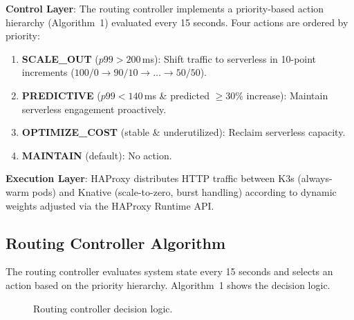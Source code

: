 \documentclass[conference,letterpaper]{IEEEtran}
\begin{document}
\textbf{Control Layer}: The routing controller implements a priority-based action hierarchy (Algorithm~1) evaluated every 15 seconds. Four actions are ordered by priority:
\begin{enumerate}
    \item \textbf{SCALE\_OUT} ($p99 > 200$\,ms): Shift traffic to serverless in 10-point increments ($100/0 \rightarrow 90/10 \rightarrow \ldots \rightarrow 50/50$).
    \item \textbf{PREDICTIVE} ($p99 < 140$\,ms \& predicted $\geq$30\% increase): Maintain serverless engagement proactively.
    \item \textbf{OPTIMIZE\_COST} (stable \& underutilized): Reclaim serverless capacity.
    \item \textbf{MAINTAIN} (default): No action.
\end{enumerate}

\textbf{Execution Layer}: HAProxy distributes HTTP traffic between K3s (always-warm pods) and Knative (scale-to-zero, burst handling) according to dynamic weights adjusted via the HAProxy Runtime API.

\subsection{Routing Controller Algorithm}

The routing controller evaluates system state every 15 seconds and selects an action based on the priority hierarchy. Algorithm~1 shows the decision logic.

\begin{figure}[htbp]
\centering
{}
\caption{Routing controller decision logic.}
\label{fig:algorithm}
\end{figure}
\end{document}

